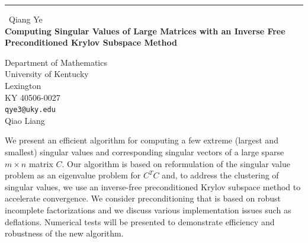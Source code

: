 \documentclass{report}
\begin{document}
\begin{center}
\rule{6in}{1pt} \
{\large Qiang Ye \\
{\bf Computing Singular Values of Large Matrices with an Inverse Free Preconditioned Krylov Subspace Method}}

Department of Mathematics \\ University of Kentucky \\ Lexington \\ KY 40506-0027
\\
{\tt qye3@uky.edu}\\
Qiao Liang\end{center}

We present an efficient algorithm for computing a few extreme (largest
and smallest) singular values and corresponding singular vectors of a
large sparse $m\times n$ matrix $C$. Our algorithm is based on
reformulation of the singular value problem as an eigenvalue problem for
$C^T C$ and, to address the clustering of singular values, we use an
inverse-free preconditioned Krylov subspace method to accelerate
convergence. We consider preconditioning that is based on robust
incomplete factorizations and we discuss various implementation issues
such as deflations. Numerical tests will be presented to demonstrate
efficiency and robustness of the new algorithm.
\end{document}
